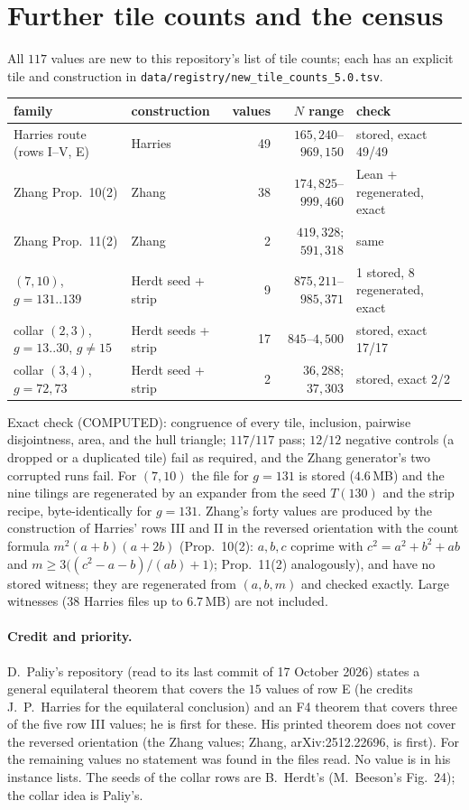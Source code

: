 \documentclass[11pt]{article}
\theoremstyle{remark}
\begin{document}
\section{Further tile counts and the census}\label{sec:table}
All $117$ values are new to this repository's list of tile counts; each has an explicit tile and construction in \texttt{data/registry/new\_tile\_counts\_5.0.tsv}.
\begin{center}\footnotesize
\begin{tabular}{@{}llrrl@{}}
\toprule
family & construction & values & $N$ range & check\\
\midrule
Harries route (rows I--V, E) & Harries & 49 & $165{,}240$--$969{,}150$ & stored, exact 49/49\\
Zhang Prop.~10(2) & Zhang & 38 & $174{,}825$--$999{,}460$ & Lean + regenerated, exact\\
Zhang Prop.~11(2) & Zhang & 2 & $419{,}328$; $591{,}318$ & same\\
$(7,10)$, $g=131..139$ & Herdt seed + strip & 9 & $875{,}211$--$985{,}371$ & 1 stored, 8 regenerated, exact\\
collar $(2,3)$, $g=13..30$, $g\ne15$ & Herdt seeds + strip & 17 & $845$--$4{,}500$ & stored, exact 17/17\\
collar $(3,4)$, $g=72,73$ & Herdt seed + strip & 2 & $36{,}288$; $37{,}303$ & stored, exact 2/2\\
\bottomrule
\end{tabular}
\end{center}
Exact check (COMPUTED): congruence of every tile, inclusion, pairwise disjointness, area, and the hull triangle; $117/117$ pass; $12/12$ negative controls (a dropped or a duplicated tile) fail as required, and the Zhang generator's two corrupted runs fail. For $(7,10)$ the file for $g=131$ is stored ($4.6$\,MB) and the nine tilings are regenerated by an expander from the seed $T(130)$ and the strip recipe, byte-identically for $g=131$. Zhang's forty values are produced by the construction of Harries' rows III and II in the reversed orientation with the count formula $m^2(a+b)(a+2b)$ (Prop.~10(2): $a,b,c$ coprime with $c^2=a^2+b^2+ab$ and $m\ge3\big((c^2-a-b)/(ab)+1\big)$; Prop.~11(2) analogously), and have no stored witness; they are regenerated from $(a,b,m)$ and checked exactly. Large witnesses ($38$ Harries files up to $6.7$\,MB) are not included.

\paragraph{Credit and priority.} D.~Paliy's repository (read to its last commit of 17 October 2026) states a general equilateral theorem that covers the $15$ values of row E (he credits J.~P.~Harries for the equilateral conclusion) and an F4 theorem that covers three of the five row III values; he is first for these. His printed theorem does not cover the reversed orientation (the Zhang values; Zhang, arXiv:2512.22696, is first). For the remaining values no statement was found in the files read. No value is in his instance lists. The seeds of the collar rows are B.~Herdt's (M.~Beeson's Fig.~24); the collar idea is Paliy's.
\end{document}
